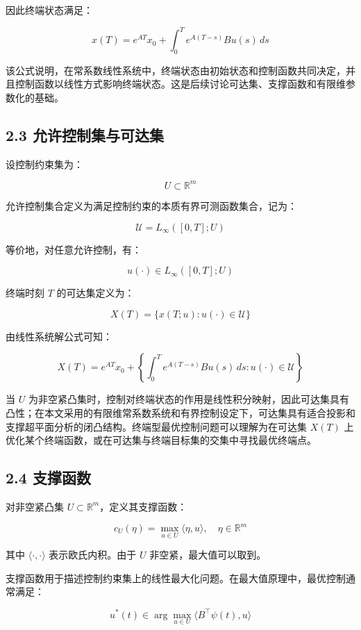\documentclass[UTF8,a4paper,zihao=-4]{ctexart}
\begin{document}
因此终端状态满足：

\[
x(T)=e^{AT}x_0+\int_0^T e^{A(T-s)}Bu(s)\,ds
\]

该公式说明，在常系数线性系统中，终端状态由初始状态和控制函数共同决定，并且控制函数以线性方式影响终端状态。这是后续讨论可达集、支撑函数和有限维参数化的基础。
\subsection{2.3 允许控制集与可达集}

设控制约束集为：

\[
U\subset\mathbb{R}^m
\]

允许控制集合定义为满足控制约束的本质有界可测函数集合，记为：

\[
\mathcal{U}=L_\infty([0,T];U)
\]

等价地，对任意允许控制，有：

\[
u(\cdot)\in L_\infty([0,T];U)
\]

终端时刻 $T$ 的可达集定义为：

\[
X(T)=\{x(T;u):u(\cdot)\in\mathcal{U}\}
\]

由线性系统解公式可知：

\[
X(T)=e^{AT}x_0+
\left\{
\int_0^T e^{A(T-s)}Bu(s)\,ds:
u(\cdot)\in\mathcal{U}
\right\}
\]






当 $U$ 为非空紧凸集时，控制对终端状态的作用是线性积分映射，因此可达集具有凸性；在本文采用的有限维常系数系统和有界控制设定下，可达集具有适合投影和支撑超平面分析的闭凸结构\cite[第76--91页]{lee1972}\cite[第32--40页]{kiselev2007}。终端型最优控制问题可以理解为在可达集 $X(T)$ 上优化某个终端函数，或在可达集与终端目标集的交集中寻找最优终端点。

\subsection{2.4 支撑函数}

对非空紧凸集 $U\subset\mathbb{R}^m$，定义其支撑函数\cite[第29--37页]{blagodatskikh2001}\cite[第3--4页]{avvakumov1995}：

\[
c_U(\eta)=\max_{u\in U}\langle \eta,u\rangle,\quad \eta\in\mathbb{R}^m
\]

其中 $\langle\cdot,\cdot\rangle$ 表示欧氏内积。由于 $U$ 非空紧，最大值可以取到。

支撑函数用于描述控制约束集上的线性最大化问题\cite[第3--4页]{avvakumov1995}。在最大值原理中，最优控制通常满足：

\[
u^*(t)\in\arg\max_{u\in U}\langle B^\top\psi(t),u\rangle
\]
\end{document}
